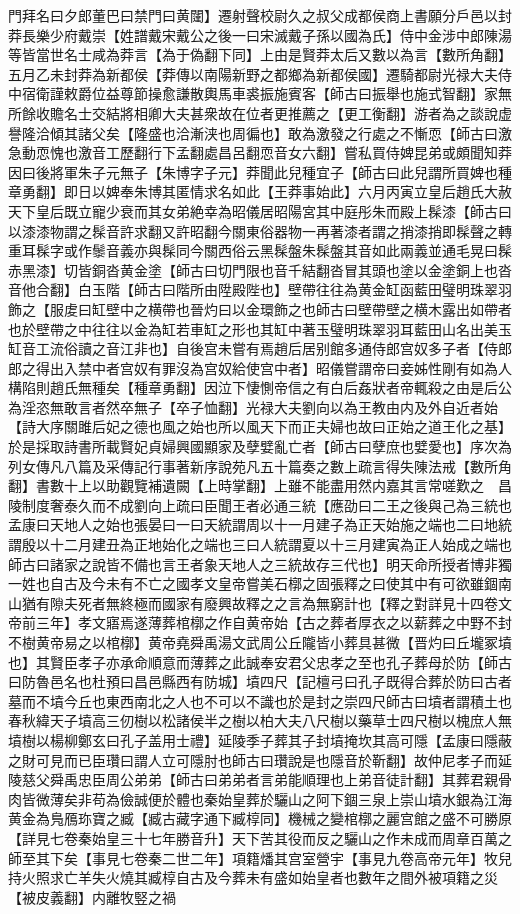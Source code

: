 門拜名曰夕郎董巴曰禁門曰黄闥】遷射聲校尉久之叔父成都侯商上書願分戶邑以封莽長樂少府戴崇【姓譜戴宋戴公之後一曰宋滅戴子孫以國為氏】侍中金涉中郎陳湯等皆當世名士咸為莽言【為于偽翻下同】上由是賢莽太后又數以為言【數所角翻】五月乙未封莽為新都侯【莽傳以南陽新野之都鄉為新都侯國】遷騎都尉光禄大夫侍中宿衛謹敕爵位益尊節操愈謙散輿馬車裘振施賓客【師古曰振舉也施式智翻】家無所餘收贍名士交結將相卿大夫甚衆故在位者更推薦之【更工衡翻】游者為之談說虚譽隆洽傾其諸父矣【隆盛也洽漸浃也周徧也】敢為激發之行處之不慚恧【師古曰激急動恧愧也激音工歷翻行下孟翻處昌呂翻恧音女六翻】嘗私買侍婢昆弟或頗聞知莽因曰後將軍朱子元無子【朱博字子元】莽聞此兒種宜子【師古曰此兒謂所買婢也種章勇翻】即日以婢奉朱博其匿情求名如此【王莽事始此】六月丙寅立皇后趙氏大赦天下皇后既立寵少衰而其女弟絶幸為昭儀居昭陽宮其中庭彤朱而殿上髹漆【師古曰以漆漆物謂之髹音許求翻又許昭翻今關東俗器物一再著漆者謂之捎漆捎即髹聲之轉重耳髹字或作䰍音義亦與髹同今關西俗云黑髹盤朱髹盤其音如此兩義並通毛晃曰髹赤黑漆】切皆銅沓黄金塗【師古曰切門限也音千結翻沓冒其頭也塗以金塗銅上也沓音他合翻】白玉階【師古曰階所由陞殿陛也】壁帶往往為黄金缸函藍田璧明珠翠羽飾之【服䖍曰缸壁中之横帶也晉灼曰以金環飾之也師古曰壁帶壁之横木露出如帶者也於壁帶之中往往以金為缸若車缸之形也其缸中著玉璧明珠翠羽耳藍田山名出美玉缸音工流俗讀之音江非也】自後宫未嘗有焉趙后居别館多通侍郎宫奴多子者【侍郎郎之得出入禁中者宫奴有罪沒為宫奴給使宫中者】昭儀嘗謂帝曰妾姊性剛有如為人構陷則趙氏無種矣【種章勇翻】因泣下悽惻帝信之有白后姦狀者帝輒殺之由是后公為淫恣無敢言者然卒無子【卒子恤翻】光禄大夫劉向以為王教由内及外自近者始【詩大序關雎后妃之德也風之始也所以風天下而正夫婦也故曰正始之道王化之基】於是採取詩書所載賢妃貞婦興國顯家及孽嬖亂亡者【師古曰孽庶也嬖愛也】序次為列女傳凡八篇及采傳記行事著新序說苑凡五十篇奏之數上疏言得失陳法戒【數所角翻】書數十上以助觀覽補遺闕【上時掌翻】上雖不能盡用然内嘉其言常嗟歎之　昌陵制度奢泰久而不成劉向上疏曰臣聞王者必通三統【應劭曰二王之後與己為三統也孟康曰天地人之始也張晏曰一曰天統謂周以十一月建子為正天始施之端也二曰地統謂殷以十二月建丑為正地始化之端也三曰人統謂夏以十三月建寅為正人始成之端也師古曰諸家之說皆不備也言王者象天地人之三統故存三代也】明天命所授者博非獨一姓也自古及今未有不亡之國孝文皇帝嘗美石槨之固張釋之曰使其中有可欲雖錮南山猶有隙夫死者無終極而國家有廢興故釋之之言為無窮計也【釋之對詳見十四卷文帝前三年】孝文寤焉遂薄葬棺槨之作自黄帝始【古之葬者厚衣之以薪葬之中野不封不樹黄帝易之以棺槨】黄帝堯舜禹湯文武周公丘隴皆小葬具甚微【晋灼曰丘壠冢墳也】其賢臣孝子亦承命順意而薄葬之此誠奉安君父忠孝之至也孔子葬母於防【師古曰防魯邑名也杜預曰昌邑縣西有防城】墳四尺【記檀弓曰孔子既得合葬於防曰古者墓而不墳今丘也東西南北之人也不可以不識也於是封之崇四尺師古曰墳者謂積土也春秋緯天子墳高三仞樹以松諸侯半之樹以柏大夫八尺樹以藥草士四尺樹以槐庶人無墳樹以楊柳鄭玄曰孔子盖用士禮】延陵季子葬其子封墳掩坎其高可隱【孟康曰隱蔽之財可見而已臣瓚曰謂人立可隱肘也師古曰瓚說是也隱音於靳翻】故仲尼孝子而延陵慈父舜禹忠臣周公弟弟【師古曰弟弟者言弟能順理也上弟音徒計翻】其葬君親骨肉皆微薄矣非苟為儉誠便於體也秦始皇葬於驪山之阿下錮三泉上崇山墳水銀為江海黄金為鳬鴈珎寶之臧【臧古藏字通下臧椁同】機械之變棺槨之麗宫館之盛不可勝原【詳見七卷秦始皇三十七年勝音升】天下苦其役而反之驪山之作未成而周章百萬之師至其下矣【事見七卷秦二世二年】項籍燔其宫室營宇【事見九卷高帝元年】牧兒持火照求亡羊失火燒其臧椁自古及今葬未有盛如始皇者也數年之間外被項籍之災【被皮義翻】内離牧竪之禍